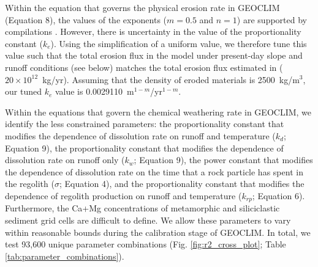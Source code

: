 \documentclass[11pt,letterpaper]{article}
\begin{document}
Within the equation that governs the physical erosion rate in GEOCLIM (Equation 8), the values of the exponents ($m=0.5$ and $n=1$) are supported by compilations \citep{Lague2013a}. However, there is uncertainty in the value of the proportionality constant ($k_e$). Using the simplification of a uniform value, we therefore tune this value such that the total erosion flux in the model under present-day slope and runoff conditions (see below) matches the total erosion flux estimated in \citet{Milliman2013a} ($20\times10^{12}$~kg/yr). Assuming that the density of eroded materials is 2500~kg/m$^{3}$, our tuned $k_e$ value is 0.0029110~m$^{1-m}$/yr$^{1-m}$.

Within the equations that govern the chemical weathering rate in GEOCLIM, we identify the less constrained parameters: the proportionality constant that modifies the dependence of dissolution rate on runoff and temperature ($k_{d}$; Equation 9), the proportionality constant that modifies the dependence of dissolution rate on runoff only ($k_{w}$; Equation 9), the power constant that modifies the dependence of dissolution rate on the time that a rock particle has spent in the regolith ($\sigma$; Equation 4), and the proportionality constant that modifies the dependence of regolith production on runoff and temperature ($k_{rp}$; Equation 6). Furthermore, the Ca+Mg concentrations of metamorphic and siliciclastic sediment grid cells are difficult to define. We allow these parameters to vary within reasonable bounds during the calibration stage of GEOCLIM. In total, we test 93,600 unique parameter combinations (Fig. \ref{fig:r2_cross_plot}; Table \ref{tab:parameter_combinations}).
\end{document}
